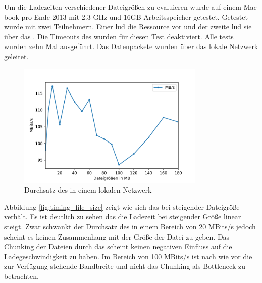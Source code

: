 Um die Ladezeiten verschiedener Dateigrößen zu evaluieren wurde auf einem Mac book pro Ende 2013 mit 2.3 GHz und 16GB Arbeitsspeicher getestet. 
Getestet wurde mit zwei Teilnehmern. Einer lud die Ressource vor und der zweite lud sie über das \pTp \cdn. Die Timeouts des \pTp \cdns wurden für diesen Test deaktiviert. Alle tests wurden zehn Mal ausgeführt. Das \pTp Datenpackete wurden über das lokale Netzwerk geleitet.

\begin{figure}[!h]
	\centering
	\includegraphics[width=0.8\textwidth]{figures/durchsatz_file_size}
	\caption[A Figure Short-Title]{Durchsatz des \ptp \cdns in einem lokalen Netzwerk}
	\label{fig:durchsatz_file_size}
\end{figure}

Abbildung \ref{fig:timing_file_size} zeigt wie sich das \cdn bei steigender Dateigröße verhält. Es ist deutlich zu sehen das die Ladezeit bei steigender Größe linear steigt. Zwar schwankt der Durchsatz des \cdns in einem Bereich von 20 MBits/s jedoch scheint es keinen Zusammenhang mit der Größe der Datei zu geben. Das Chunking der Dateien durch das \pTp \cdn scheint keinen negativen Einfluss auf die Ladegeschwindigkeit zu haben. Im Bereich von 100 MBits/s ist nach wie vor die zur Verfügung stehende Bandbreite und nicht das Chunking als Bottleneck zu betrachten.



